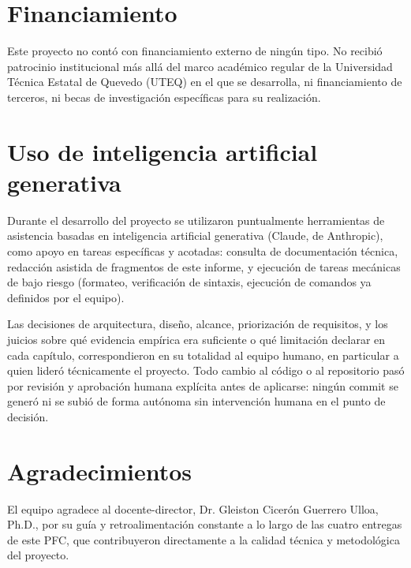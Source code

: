 \section{Financiamiento}

Este proyecto no contó con financiamiento externo de ningún tipo. No
recibió patrocinio institucional más allá del marco académico regular
de la Universidad Técnica Estatal de Quevedo (UTEQ) en el que se
desarrolla, ni financiamiento de terceros, ni becas de investigación
específicas para su realización.

\section{Uso de inteligencia artificial generativa}

Durante el desarrollo del proyecto se utilizaron puntualmente
herramientas de asistencia basadas en inteligencia artificial generativa
(Claude, de Anthropic), como apoyo en tareas específicas y acotadas:
consulta de documentación técnica, redacción asistida de fragmentos de
este informe, y ejecución de tareas mecánicas de bajo riesgo (formateo,
verificación de sintaxis, ejecución de comandos ya definidos por el
equipo).

Las decisiones de arquitectura, diseño, alcance, priorización de
requisitos, y los juicios sobre qué evidencia empírica era suficiente o
qué limitación declarar en cada capítulo, correspondieron en su
totalidad al equipo humano, en particular a quien lideró técnicamente
el proyecto. Todo cambio al código o al repositorio pasó por revisión y
aprobación humana explícita antes de aplicarse: ningún commit se generó
ni se subió de forma autónoma sin intervención humana en el punto de
decisión.

\section{Agradecimientos}

El equipo agradece al docente-director, Dr. Gleiston Cicerón Guerrero
Ulloa, Ph.D., por su guía y retroalimentación constante a lo largo de
las cuatro entregas de este PFC, que contribuyeron directamente a la
calidad técnica y metodológica del proyecto.
